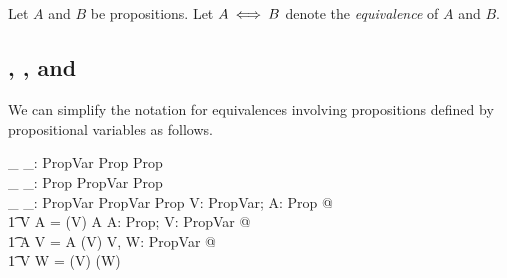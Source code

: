 \documentclass[11pt, oneside]{article}
\begin{document}
\subsection{}

Let $A$ and $B$ be propositions.
Let $A \mathbin{\iff} B$ denote the {\it equivalence} of $A$ and $B$.

\subsection{, , and }

We can simplify the notation for equivalences involving propositions defined by propositional variables as follows.

\begin{axdef}
	\_ \equivPropVP \_: PropVar \cross Prop \inj Prop \\
	\_ \equivPropPV \_: Prop \cross PropVar \inj Prop \\
	\_ \equivPropVV \_: PropVar \cross PropVar \inj Prop
\where
	\forall V: PropVar; A: Prop @ \\
	\t1	V \equivPropVP A = (\varProp V) \equivProp A
\also
	\forall A: Prop; V: PropVar @ \\
	\t1	A \equivPropPV V = A \equivProp (\varProp V)
\also
	\forall V, W: PropVar @ \\
	\t1	V \equivPropVV W = (\varProp V) \equivProp (\varProp W)
\end{axdef}

\printbibliography
\end{document}
